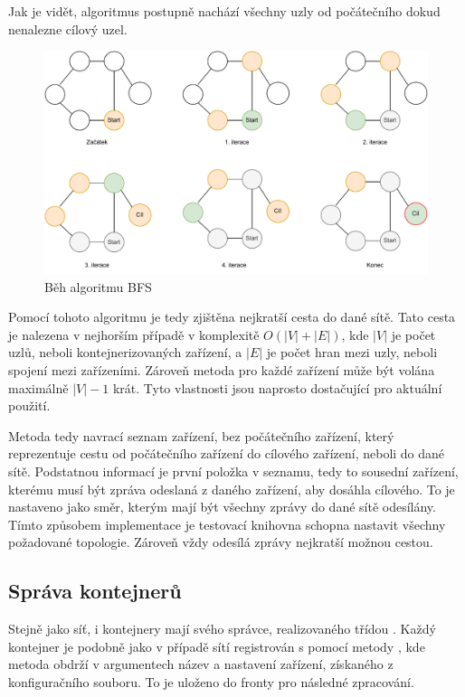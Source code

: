 Jak je vidět, algoritmus postupně nachází všechny uzly od počátečního dokud nenalezne cílový uzel. 

\begin{figure}[htbp]
    \centering 
    \includegraphics[width=\textwidth]{assets/img/bfs.pdf}
    \caption{Běh algoritmu BFS}
    \label{fig:bfs}
\end{figure}


Pomocí tohoto algoritmu je tedy zjištěna nejkratší cesta do dané sítě. Tato cesta je nalezena v nejhorším případě v komplexitě $O(|V| + |E|)$, kde $|V|$ je počet uzlů, neboli kontejnerizovaných zařízení, a $|E|$ je počet hran mezi uzly, neboli spojení mezi zařízeními. Zároveň metoda pro každé zařízení může být volána maximálně $|V| - 1$ krát. Tyto vlastnosti jsou naprosto dostačující pro aktuální použití.

Metoda tedy navrací seznam zařízení, bez počátečního zařízení, který reprezentuje cestu od počátečního zařízení do cílového zařízení, neboli do dané sítě. Podstatnou informací je první položka v seznamu, tedy to sousední zařízení, kterému musí být zpráva odeslaná z daného zařízení, aby dosáhla cílového. To je nastaveno jako směr, kterým mají být všechny zprávy do dané sítě odesílány. Tímto způsobem implementace je testovací knihovna schopna nastavit všechny požadované topologie. Zároveň vždy odesílá zprávy nejkratší možnou cestou.

\subsection{Správa kontejnerů}\label{sec:cont_managment}

Stejně jako síť, i kontejnery mají svého správce, realizovaného třídou . Každý kontejner je podobně jako v případě sítí registrován s pomocí metody , kde metoda obdrží v argumentech název a nastavení zařízení, získaného z konfiguračního souboru. To je uloženo do fronty pro následné zpracování.


